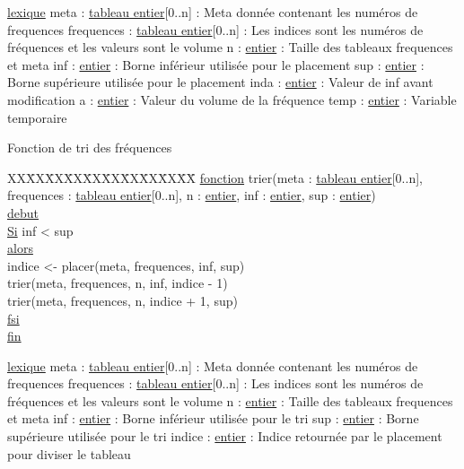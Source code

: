 \ul{lexique}\newline
meta : \ul{tableau entier}[0..n] : Meta donnée contenant les numéros de frequences\newline
frequences : \ul{tableau entier}[0..n] : Les indices sont les numéros de fréquences et les valeurs sont le volume\newline
n : \ul{entier} : Taille des tableaux frequences et meta\newline
inf : \ul{entier} : Borne inférieur utilisée pour le placement\newline
sup : \ul{entier} : Borne supérieure utilisée pour le placement\newline
inda : \ul{entier} : Valeur de inf avant modification\newline
a : \ul{entier} : Valeur du volume de la fréquence\newline
temp : \ul{entier} : Variable temporaire\newline


Fonction de tri des fréquences\newline
\begin{tabbing}
\kill XX\=XX\=XX\=XX\=XX\=XX\=XX\=XX\=XX\=XX\=
\kill
\ul{fonction} trier(meta : \ul{tableau entier}[0..n], frequences : \ul{tableau entier}[0..n], n : \ul{entier}, inf : \ul{entier}, sup : \ul{entier})\\
\ul{debut}\\
    \>\ul{Si} inf < sup\\
    \>\ul{alors}\\
        \>\>indice <- placer(meta, frequences, inf, sup)\\
        \>\>trier(meta, frequences, n, inf, indice - 1)\\
        \>\>trier(meta, frequences, n, indice + 1, sup)\\
    \>\ul{fsi}\\
\ul{fin}\\ 
\end{tabbing}
\ul{lexique}\newline
meta : \ul{tableau entier}[0..n] : Meta donnée contenant les numéros de frequences\newline
frequences : \ul{tableau entier}[0..n] : Les indices sont les numéros de fréquences et les valeurs sont le volume\newline
n : \ul{entier} : Taille des tableaux frequences et meta\newline
inf : \ul{entier} : Borne inférieur utilisée pour le tri\newline
sup : \ul{entier} : Borne supérieure utilisée pour le tri\newline
indice : \ul{entier} : Indice retournée par le placement pour diviser le tableau\newline

